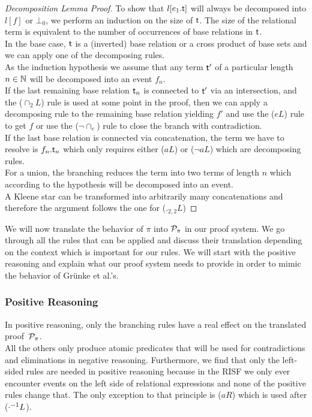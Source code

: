 \documentclass[a4paper,twoside,12pt, english]{article}
\begin{document}
\begin{proof}[Decomposition Lemma Proof]
To show that $l[e_1.\textsf{\upshape t}]$ will always be decomposed into $l[f]$ or $\bot_0$, we perform an induction on the size of $\textsf{\upshape t}$. 
The size of the relational term is equivalent to the number of occurrences of base relations in $\textsf{\upshape t}$. \\

In the base case, $\textsf{\upshape t}$ is a (inverted) base relation or a cross product of base sets and we can apply one of the decomposing rules. \\

As the induction hypothesis we assume that any term $\textsf{\upshape t}'$ of a particular length $n \in \mathbb{N}$ will be decomposed into an event $f_n$. \\

If the last remaining base relation $\textsf{\upshape t}_n$ is connected to $\textsf{\upshape t}'$ via an intersection, and the ($\cap_2 L$) rule is used at some point in the proof, then we can apply a decomposing rule to the remaining base relation yielding $f'$ and use the ($eL$) rule to get $f$ or use the ($\neg \cap_e$) rule to close the branch with contradiction. \\
If the last base relation is connected via concatenation, the term we have to resolve is $f_n.\textsf{\upshape t}_n$ which only requires either ($aL$) or ($\neg aL$) which are decomposing rules. \\
For a union, the branching reduces the term into two terms of length $n$ which according to the hypothesis will be decomposed into an event. \\
A Kleene star can be transformed into arbitrarily many concatenations and therefore the argument follows the one for ($._{2,2}L$) 
\end{proof}

We will now translate the behavior of $\pi$ into $\mathcal{P}_\pi$ in our proof system. We go through all the rules that can be applied and discuss their translation depending on the context which is important for our rules.
We will start with the positive reasoning and explain what our proof system needs to provide in order to mimic the behavior of Grünke et al.'s. 

\subsubsection{Positive Reasoning} 
In positive reasoning, only the branching rules have a real effect on the translated proof~$\mathcal{P}_\pi$.\\ All the others only produce atomic predicates that will be used for contradictions and eliminations in negative reasoning. Furthermore, we find that only the left-sided rules are needed in positive reasoning because in the RISF we only ever encounter events on the left side of relational expressions and none of the positive rules change that. The only exception to that principle is ($aR$) which is used after ($\cdot^{{-1}} L$).
\end{document}
